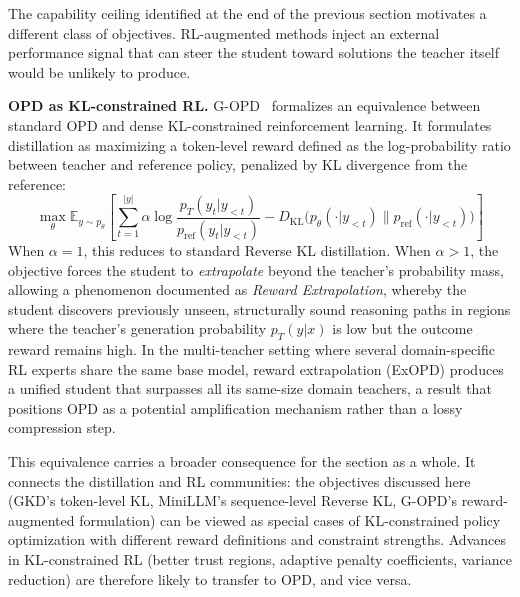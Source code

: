 \documentclass{article} %
\newcommand{\E}{\mathbb{E}}
\newcommand{\KL}{D_{\mathrm{KL}}}
\newcommand{\ptheta}{p_\theta}
\newcommand{\pteacher}{p_T}
\begin{document}
The capability ceiling identified at the end of the previous section motivates a different class of objectives. RL-augmented methods inject an external performance signal that can steer the student toward solutions the teacher itself would be unlikely to produce.

\textbf{OPD as KL-constrained RL.} G-OPD~\citep{2602.12125} formalizes an equivalence between standard OPD and dense KL-constrained reinforcement learning. It formulates distillation as maximizing a token-level reward defined as the log-probability ratio between teacher and reference policy, penalized by KL divergence from the reference:
\begin{equation*}
    \max_\theta \E_{y \sim \ptheta} \left[ \sum_{t=1}^{|y|} \alpha \log \frac{\pteacher(y_t | y_{<t})}{p_{\text{ref}}(y_t | y_{<t})} - \KL\big(\ptheta(\cdot | y_{<t}) \parallel p_{\text{ref}}(\cdot | y_{<t})\big) \right]
\end{equation*}
When $\alpha = 1$, this reduces to standard Reverse KL distillation. When $\alpha > 1$, the objective forces the student to \emph{extrapolate} beyond the teacher's probability mass, allowing a phenomenon documented as \emph{Reward Extrapolation}, whereby the student discovers previously unseen, structurally sound reasoning paths in regions where the teacher's generation probability $\pteacher(y|x)$ is low but the outcome reward remains high. In the multi-teacher setting where several domain-specific RL experts share the same base model, reward extrapolation (ExOPD) produces a unified student that surpasses all its same-size domain teachers, a result that positions OPD as a potential amplification mechanism rather than a lossy compression step.

This equivalence carries a broader consequence for the section as a whole. It connects the distillation and RL communities: the objectives discussed here (GKD's token-level KL, MiniLLM's sequence-level Reverse KL, G-OPD's reward-augmented formulation) can be viewed as special cases of KL-constrained policy optimization with different reward definitions and constraint strengths. Advances in KL-constrained RL (better trust regions, adaptive penalty coefficients, variance reduction) are therefore likely to transfer to OPD, and vice versa.
\end{document}
